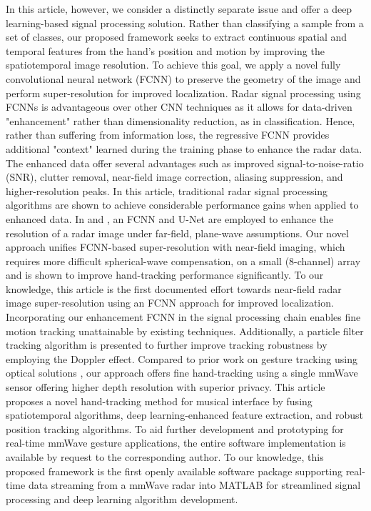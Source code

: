 \documentclass[10pt,journal,final]{IEEEtran}
\begin{document}
In this article, however, we consider a distinctly separate issue and offer a deep learning-based signal processing solution.
Rather than classifying a sample from a set of classes, our proposed framework seeks to extract continuous spatial and temporal features from the hand's position and motion by improving the spatiotemporal image resolution.
To achieve this goal, we apply a novel fully convolutional neural network (FCNN) to preserve the geometry of the image and perform super-resolution for improved localization.
Radar signal processing using FCNNs is advantageous over other CNN techniques as it allows for data-driven "enhancement" rather than dimensionality reduction, as in classification.
Hence, rather than suffering from information loss, the regressive FCNN provides additional "context" learned during the training phase to enhance the radar data.
The enhanced data offer several advantages such as improved signal-to-noise-ratio (SNR), clutter removal, near-field image correction, aliasing suppression, and higher-resolution peaks.
In this article, traditional radar signal processing algorithms are shown to achieve considerable performance gains when applied to enhanced data.
In \cite{sar_cnn:enhance1} and \cite{kim2020aziumth}, an FCNN and U-Net are employed to enhance the resolution of a radar image under far-field, plane-wave assumptions.
Our novel approach unifies FCNN-based super-resolution with near-field imaging, which requires more difficult spherical-wave compensation, on a small (8-channel) array and is shown to improve hand-tracking performance significantly.
To our knowledge, this article is the first documented effort towards near-field radar image super-resolution using an FCNN approach for improved localization.
Incorporating our enhancement FCNN in the signal processing chain enables fine motion tracking unattainable by existing techniques.
Additionally, a particle filter tracking algorithm is presented to further improve tracking robustness by employing the Doppler effect. 
Compared to prior work on gesture tracking using optical solutions \cite{optical_tracking:kinect,polfreman2011multi,jensenius2013kinectofon,han2014lessons,hantrakul2014implementations,intro:RGBcamera}, our approach offers fine hand-tracking using a single mmWave sensor offering higher depth resolution with superior privacy. 
This article proposes a novel hand-tracking method for musical interface by fusing spatiotemporal algorithms, deep learning-enhanced feature extraction, and robust position tracking algorithms. 
To aid further development and prototyping for real-time mmWave gesture applications, the entire software implementation is available by request to the corresponding author. 
To our knowledge, this proposed framework is the first openly available software package supporting real-time data streaming from a mmWave radar into MATLAB for streamlined signal processing and deep learning algorithm development. 
\end{document}
